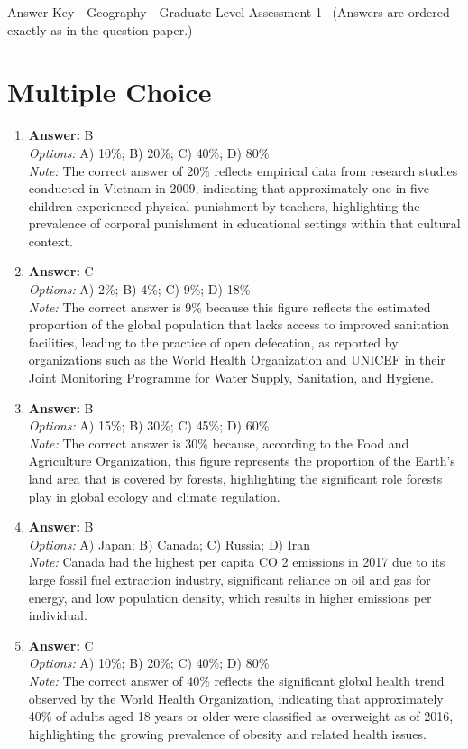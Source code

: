 \documentclass[12pt]{article}
\begin{document}
\begin{center}
Answer Key - Geography - Graduate Level Assessment 1 \
\small (Answers are ordered exactly as in the question paper.)
\end{center}

\section*{Multiple Choice}
\begin{enumerate}[label=\arabic*.]
\item \textbf{Answer:} B
\\ \textit{Options:} A) 10\%; B) 20\%; C) 40\%; D) 80\%
\\ \textit{Note:} The correct answer of 20\% reflects empirical data from research studies conducted in Vietnam in 2009, indicating that approximately one in five children experienced physical punishment by teachers, highlighting the prevalence of corporal punishment in educational settings within that cultural context.
\item \textbf{Answer:} C
\\ \textit{Options:} A) 2\%; B) 4\%; C) 9\%; D) 18\%
\\ \textit{Note:} The correct answer is 9\% because this figure reflects the estimated proportion of the global population that lacks access to improved sanitation facilities, leading to the practice of open defecation, as reported by organizations such as the World Health Organization and UNICEF in their Joint Monitoring Programme for Water Supply, Sanitation, and Hygiene.
\item \textbf{Answer:} B
\\ \textit{Options:} A) 15\%; B) 30\%; C) 45\%; D) 60\%
\\ \textit{Note:} The correct answer is 30\% because, according to the Food and Agriculture Organization, this figure represents the proportion of the Earth's land area that is covered by forests, highlighting the significant role forests play in global ecology and climate regulation.
\item \textbf{Answer:} B
\\ \textit{Options:} A) Japan; B) Canada; C) Russia; D) Iran
\\ \textit{Note:} Canada had the highest per capita CO 2 emissions in 2017 due to its large fossil fuel extraction industry, significant reliance on oil and gas for energy, and low population density, which results in higher emissions per individual.
\item \textbf{Answer:} C
\\ \textit{Options:} A) 10\%; B) 20\%; C) 40\%; D) 80\%
\\ \textit{Note:} The correct answer of 40\% reflects the significant global health trend observed by the World Health Organization, indicating that approximately 40\% of adults aged 18 years or older were classified as overweight as of 2016, highlighting the growing prevalence of obesity and related health issues.
\end{enumerate}
\end{document}
